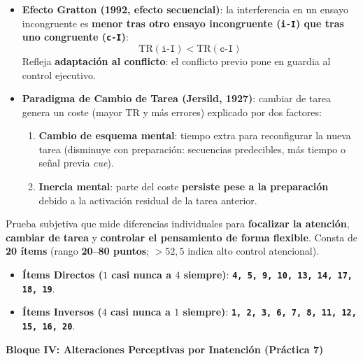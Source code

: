 \documentclass[11pt,a4paper]{article}
\newcommand{\bloque}[1]{%
  \vspace{0.6em}
  \begin{tcolorbox}[colback=Primary,colframe=Primary,arc=3pt,left=12pt,right=12pt,top=8pt,bottom=8pt,boxrule=0pt,after skip=8pt]
    {\Large\bfseries\color{white} #1}
  \end{tcolorbox}
}
\begin{document}
\begin{itemize}
  \item \textbf{Efecto Gratton (1992, efecto secuencial)}: la interferencia en un ensayo incongruente es \textbf{menor tras otro ensayo incongruente (\texttt{i-I}) que tras uno congruente (\texttt{c-I})}:
  \[
    \text{TR}(\texttt{i-I}) < \text{TR}(\texttt{c-I})
  \]
  Refleja \textbf{adaptación al conflicto}: el conflicto previo pone en guardia al control ejecutivo.
  \item \textbf{Paradigma de Cambio de Tarea (Jersild, 1927)}: cambiar de tarea genera un coste (mayor TR y más errores) explicado por dos factores:
  \begin{enumerate}
    \item \textbf{Cambio de esquema mental}: tiempo extra para reconfigurar la nueva tarea (disminuye con preparación: secuencias predecibles, más tiempo o señal previa \textit{cue}).
    \item \textbf{Inercia mental}: parte del coste \textbf{persiste pese a la preparación} debido a la activación residual de la tarea anterior.
  \end{enumerate}
\end{itemize}

\begin{cajaClave}[unbreakable,title={Cuestionario de Control Atencional (Derryberry y Reed, 2002)}]
Prueba subjetiva que mide diferencias individuales para \textbf{focalizar la atención}, \textbf{cambiar de tarea} y \textbf{controlar el pensamiento de forma flexible}. Consta de \textbf{20 ítems} (rango \textbf{20--80 puntos}; \textbf{$> 52,5$} indica alto control atencional).
\begin{itemize}
  \item \textbf{Ítems Directos ($1$ casi nunca a $4$ siempre)}: \textbf{\texttt{4, 5, 9, 10, 13, 14, 17, 18, 19}}.
  \item \textbf{Ítems Inversos ($4$ casi nunca a $1$ siempre)}: \textbf{\texttt{1, 2, 3, 6, 7, 8, 11, 12, 15, 16, 20}}.
\end{itemize}
\end{cajaClave}

\bloque{Bloque IV: Alteraciones Perceptivas por Inatención (Práctica 7)}
\setcounter{section}{0}
\end{document}

